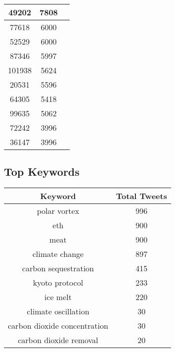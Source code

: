 \documentclass{article}\usepackage[T1]{fontenc}
\begin{document}
\begin{tabular}{|c|c|c|}
 \hline
49202 & 7808\\ 
 \hline
77618 & 6000\\ 
 \hline
52529 & 6000\\ 
 \hline
87346 & 5997\\ 
 \hline
101938 & 5624\\ 
 \hline
20531 & 5596\\ 
 \hline
64305 & 5418\\ 
 \hline
99635 & 5062\\ 
 \hline
72242 & 3996\\ 
 \hline
36147 & 3996\\ 
 \hline
\end{tabular}\subsection*{Top Keywords}\begin{tabular}{|c|c|}         \hline         Keyword & Total Tweets \\ 
 \hline
polar vortex & 996\\ 
 \hline
eth & 900\\ 
 \hline
meat & 900\\ 
 \hline
climate change & 897\\ 
 \hline
carbon sequestration & 415\\ 
 \hline
kyoto protocol & 233\\ 
 \hline
ice melt & 220\\ 
 \hline
climate oscillation & 30\\ 
 \hline
carbon dioxide concentration & 30\\ 
 \hline
carbon dioxide removal & 20\\ 
 \hline
\end{tabular}
\end{document}
